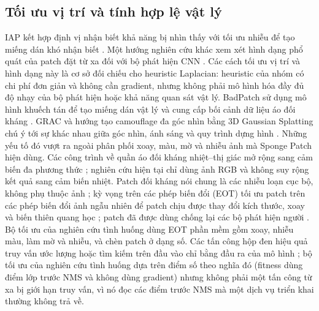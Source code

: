 \documentclass[12pt,a4paper]{article}
\begin{document}
\subsection{Tối ưu vị trí và tính hợp lệ vật lý}
IAP kết hợp định vị nhận biết khả năng bị nhìn thấy với tối ưu nhiễu để tạo miếng dán khó nhận biết \cite{iap2025}. Một hướng nghiên cứu khác xem xét hình dạng phổ quát của patch đặt từ xa đối với bộ phát hiện CNN \cite{remotepatch2025}. Các cách tối ưu vị trí và hình dạng này là cơ sở đối chiếu cho heuristic Laplacian: heuristic của nhóm có chi phí đơn giản và không cần gradient, nhưng không phải mô hình hóa đầy đủ độ nhạy của bộ phát hiện hoặc khả năng quan sát vật lý. BadPatch sử dụng mô hình khuếch tán để tạo miếng dán vật lý và cung cấp bối cảnh dữ liệu áo đối kháng \cite{badpatch2025}. GRAC và hướng tạo camouflage đa góc nhìn bằng 3D Gaussian Splatting chú ý tới sự khác nhau giữa góc nhìn, ánh sáng và quy trình dựng hình \cite{grac2025,gs3dcamo2025}. Những yếu tố đó vượt ra ngoài phân phối xoay, màu, mờ và nhiễu ảnh mà Sponge Patch hiện dùng. Các công trình về quần áo đối kháng nhiệt--thị giác mở rộng sang cảm biến đa phương thức \cite{rgbt2026,thermal2026}; nghiên cứu hiện tại chỉ dùng ảnh RGB và không suy rộng kết quả sang cảm biến nhiệt. Patch đối kháng nói chung là các nhiễu loạn cục bộ, không phụ thuộc ảnh \cite{brown2017patch}; kỳ vọng trên các phép biến đổi (EOT) tối ưu patch trên các phép biến đổi ảnh ngẫu nhiên để patch chịu được thay đổi kích thước, xoay và biến thiên quang học \cite{athalye2018eot}; patch đã được dùng chống lại các bộ phát hiện người \cite{thys2019fooling}. Bộ tối ưu của nghiên cứu tình huống dùng EOT phần mềm gồm xoay, nhiễu màu, làm mờ và nhiễu, và chèn patch ở dạng số. Các tấn công hộp đen hiệu quả truy vấn ước lượng hoặc tìm kiếm trên đầu vào chỉ bằng đầu ra của mô hình \cite{ilyas2018blackbox}; bộ tối ưu của nghiên cứu tình huống dựa trên điểm số theo nghĩa đó (fitness dùng điểm lớp trước NMS và không dùng gradient) nhưng không phải một tấn công từ xa bị giới hạn truy vấn, vì nó đọc các điểm trước NMS mà một dịch vụ triển khai thường không trả về.
\end{document}
